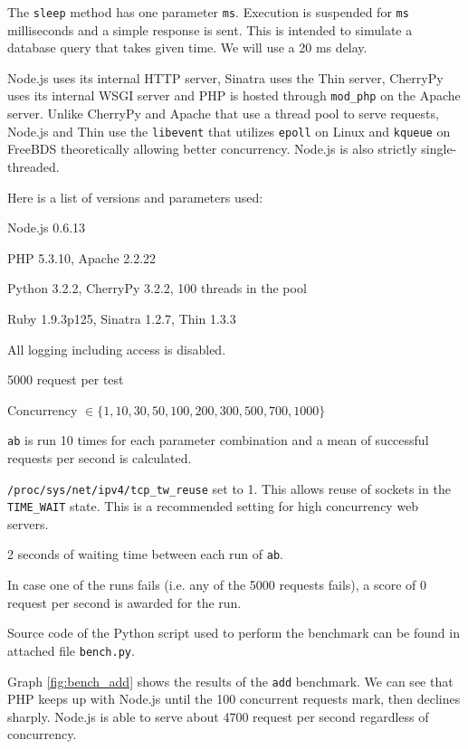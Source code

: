 \documentclass[12pt,oneside]{fithesis}
\begin{document}
		The \texttt{sleep} method has one parameter \texttt{ms}. Execution is suspended for \texttt{ms} milliseconds and a simple response is sent. This is intended to simulate a database query that takes given time. We will use a 20 ms delay.
		
		Node.js uses its internal HTTP server, Sinatra uses the Thin server, CherryPy uses its internal WSGI server and PHP is hosted through \texttt{mod\_php} on the Apache server. Unlike CherryPy and Apache that use a thread pool to serve requests, Node.js and Thin use the \texttt{libevent} that utilizes \texttt{epoll} on Linux and \texttt{kqueue} on FreeBDS theoretically allowing better concurrency. Node.js is also strictly single-threaded.
	
		Here is a list of versions and parameters used:
		\begin{compactitem}
			\item Node.js 0.6.13
			\item PHP 5.3.10, Apache 2.2.22
			\item Python 3.2.2, CherryPy 3.2.2, 100 threads in the pool
			\item Ruby 1.9.3p125, Sinatra 1.2.7, Thin 1.3.3
			\item All logging including access is disabled.
			\item 5000 request per test
			\item Concurrency $\in \lbrace 1,10,30,50,100,200,300,500,700,1000\rbrace$
			\item \texttt{ab} is run 10 times for each parameter combination and a mean of successful requests per second is calculated.
			\item \texttt{/proc/sys/net/ipv4/tcp\_tw\_reuse} set to 1. This allows reuse of sockets in the \texttt{TIME\_WAIT} state. This is a recommended setting for high concurrency web servers. 
			\item 2 seconds of waiting time between each run of \texttt{ab}.
			\item In case one of the runs fails (i.e. any of the 5000 requests fails), a score of 0 request per second is awarded for the run.
			\item Source code of the Python script used to perform the benchmark can be found in attached file \texttt{bench.py}.
		\end{compactitem}
		
		Graph \ref{fig:bench_add} shows the results of the \texttt{add} benchmark. We can see that PHP keeps up with Node.js until the 100 concurrent requests mark, then declines sharply. Node.js is able to serve about 4700 request per second regardless of concurrency.
		
\end{document}
